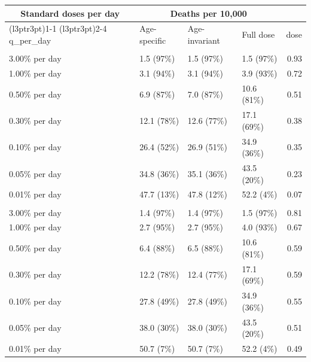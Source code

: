 
\begin{tabular}{llllr}
\toprule
\multicolumn{1}{c}{Standard doses per day} & \multicolumn{3}{c}{Deaths per 10,000} \\
\cmidrule(l{3pt}r{3pt}){1-1} \cmidrule(l{3pt}r{3pt}){2-4}
q\_per\_day & Age-specific & Age-invariant & Full dose & dose\\
\midrule
\addlinespace[0.3em]
\multicolumn{5}{l}{\textbf{Concave dose-response, R0 = 2}}\\
\hspace{1em}3.00\% per day & 1.5 (97\%) & 1.5 (97\%) & 1.5 (97\%) & 0.93\\
\hspace{1em}1.00\% per day & 3.1 (94\%) & 3.1 (94\%) & 3.9 (93\%) & 0.72\\
\hspace{1em}0.50\% per day & 6.9 (87\%) & 7.0 (87\%) & 10.6 (81\%) & 0.51\\
\hspace{1em}0.30\% per day & 12.1 (78\%) & 12.6 (77\%) & 17.1 (69\%) & 0.38\\
\hspace{1em}0.10\% per day & 26.4 (52\%) & 26.9 (51\%) & 34.9 (36\%) & 0.35\\
\hspace{1em}0.05\% per day & 34.8 (36\%) & 35.1 (36\%) & 43.5 (20\%) & 0.23\\
\hspace{1em}0.01\% per day & 47.7 (13\%) & 47.8 (12\%) & 52.2 (4\%) & 0.07\\
\addlinespace[0.3em]
\multicolumn{5}{l}{\textbf{Sigmoid dose-response, R0 = 1.1}}\\
\hspace{1em}3.00\% per day & 1.4 (97\%) & 1.4 (97\%) & 1.5 (97\%) & 0.81\\
\hspace{1em}1.00\% per day & 2.7 (95\%) & 2.7 (95\%) & 4.0 (93\%) & 0.67\\
\hspace{1em}0.50\% per day & 6.4 (88\%) & 6.5 (88\%) & 10.6 (81\%) & 0.59\\
\hspace{1em}0.30\% per day & 12.2 (78\%) & 12.4 (77\%) & 17.1 (69\%) & 0.59\\
\hspace{1em}0.10\% per day & 27.8 (49\%) & 27.8 (49\%) & 34.9 (36\%) & 0.55\\
\hspace{1em}0.05\% per day & 38.0 (30\%) & 38.0 (30\%) & 43.5 (20\%) & 0.51\\
\hspace{1em}0.01\% per day & 50.7 (7\%) & 50.7 (7\%) & 52.2 (4\%) & 0.49\\
\bottomrule
\end{tabular}
